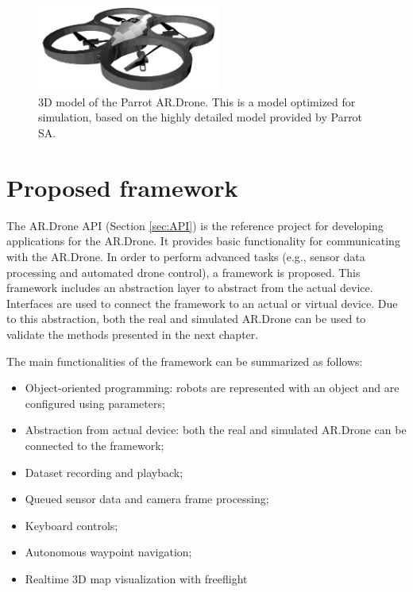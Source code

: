 \begin{figure}[htb!]
\centering
\includegraphics[width=6cm]{images/ardrone_blender_final.png}
\caption{3D model of the Parrot AR.Drone. This is a model optimized for simulation, based on the highly detailed model provided by Parrot SA.} 
\label{fig:3Dmodel}
\end{figure}


\section{Proposed framework}
\label{sec:proposed-framework}
The AR.Drone API (Section \ref{sec:API}) is the reference project for developing applications for the AR.Drone.
It provides basic functionality for communicating with the AR.Drone.
In order to perform advanced tasks (e.g., sensor data processing and automated drone control), a framework is proposed.
This framework includes an abstraction layer to abstract from the actual device.
Interfaces are used to connect the framework to an actual or virtual device.
Due to this abstraction, both the real and simulated AR.Drone can be used to validate the methods presented in the next chapter.

The main functionalities of the framework can be summarized as follows:
\begin{itemize}
\item Object-oriented programming: robots are represented with an object and are configured using parameters;
\item Abstraction from actual device: both the real and simulated AR.Drone can be connected to the framework;
\item Dataset recording and playback;
\item Queued sensor data and camera frame processing;
\item Keyboard controls;
\item Autonomous waypoint navigation;
\item Realtime 3D map visualization with freeflight
\end{itemize}

